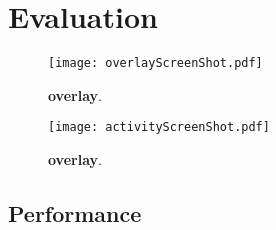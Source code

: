 \section{Evaluation}
\label{sec:eval}


\begin{figure}[t]
\centering
\texttt{[image: overlayScreenShot.pdf]}
\caption{\textbf{\name overlay}. }
\label{fig:screenshot_1}
\centering
\end{figure}




\begin{figure}[t]
\centering
\texttt{[image: activityScreenShot.pdf]}
\caption{\textbf{\name overlay}. }
\label{fig:screenshot_2}
\centering
\end{figure}


\subsection{Performance}